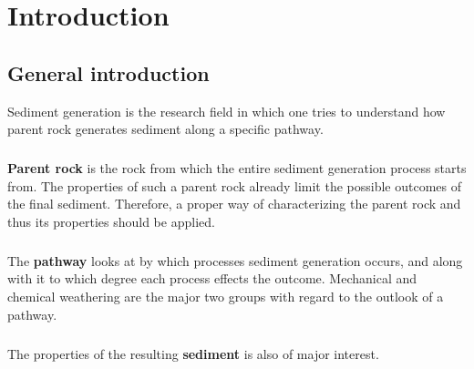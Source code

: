 \chapter{Introduction}\label{ch:introduction}

\instructionsintroduction



\section{General introduction}
    Sediment generation is the research field in which one tries to understand how parent rock generates sediment along a specific pathway. %

    \paragraph*{}
    \textbf{Parent rock} is the rock from which the entire sediment generation process starts from. %
    The properties of such a parent rock already limit the possible outcomes of the final sediment. %
    Therefore, a proper way of characterizing the parent rock and thus its properties should be applied. %

    \paragraph*{}
    The \textbf{pathway} looks at by which processes sediment generation occurs, and along with it to which degree each process effects the outcome. %
    Mechanical and chemical weathering are the major two groups with regard to the outlook of a pathway. %

    \paragraph*{}
    The properties of the resulting \textbf{sediment} is also of major interest.


